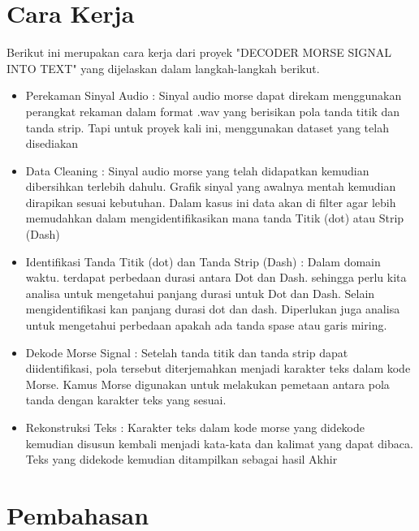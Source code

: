 \documentclass[]{article}
\begin{document}
\section{Cara Kerja}
Berikut ini merupakan cara kerja dari proyek "DECODER MORSE SIGNAL INTO TEXT" yang dijelaskan dalam langkah-langkah berikut.
\begin{itemize}
	\item Perekaman Sinyal Audio : Sinyal audio morse dapat direkam menggunakan perangkat rekaman dalam format .wav yang berisikan pola tanda titik dan tanda strip. Tapi untuk proyek kali ini, menggunakan dataset yang telah disediakan
	
	\item Data Cleaning : Sinyal audio morse yang telah didapatkan kemudian dibersihkan terlebih dahulu. Grafik sinyal yang awalnya mentah kemudian dirapikan sesuai kebutuhan. Dalam kasus ini data akan di filter agar lebih memudahkan dalam mengidentifikasikan mana tanda Titik (dot) atau Strip (Dash)
	
	\item Identifikasi Tanda Titik (dot) dan Tanda Strip (Dash) : Dalam domain waktu. terdapat perbedaan durasi antara Dot dan Dash. sehingga perlu kita analisa untuk mengetahui panjang durasi untuk Dot dan Dash. Selain mengidentifikasi kan panjang durasi dot dan dash. Diperlukan juga analisa untuk mengetahui perbedaan apakah ada tanda spase atau garis miring.
	
	\item Dekode Morse Signal :  Setelah tanda titik dan tanda strip dapat diidentifikasi, pola tersebut diterjemahkan menjadi karakter teks dalam kode Morse. Kamus Morse digunakan untuk melakukan pemetaan antara pola tanda dengan karakter teks yang sesuai.
	
	\item Rekonstruksi Teks : Karakter teks dalam kode morse yang didekode kemudian disusun kembali menjadi kata-kata dan kalimat yang dapat dibaca. Teks yang didekode kemudian ditampilkan sebagai hasil Akhir
\end{itemize}

\section{Pembahasan}
\end{document}

